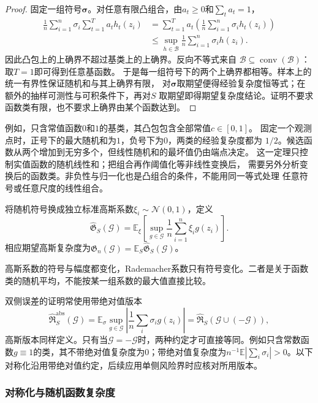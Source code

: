 \begin{proof}
固定一组符号$\bm\sigma$。对任意有限凸组合，由$a_t\geq0$和$\sum_ta_t=1$，
\[
 \begin{aligned}
 \frac1n\sum_{i=1}^n\sigma_i\sum_{t=1}^T a_t h_t(z_i)
 &=\sum_{t=1}^T a_t
    \left(\frac1n\sum_{i=1}^n\sigma_i h_t(z_i)\right)\\
 &\leq\sup_{h\in\mathcal B}\frac1n\sum_{i=1}^n\sigma_i h(z_i).
 \end{aligned}
\]
因此凸包上的上确界不超过基类上的上确界。反向不等式来自
$\mathcal B\subseteq\operatorname{conv}(\mathcal B)$：取$T=1$即可得到任意基函数。
于是每一组符号下的两个上确界都相等。样本上的统一有界性保证随机和与其上确界有限，
对$\bm\sigma$取期望便得经验复杂度恒等式；在额外的抽样可测性与可积条件下，再对$S$
取期望即得期望复杂度结论。证明不要求函数类有限，也不要求上确界由某个函数达到。
\end{proof}

例如，只含常值函数$0$和$1$的基类，其凸包包含全部常值$c\in[0,1]$。
固定一个观测点时，正号下的最大随机和为$1$，负号下为$0$，两类的经验复杂度都为
$1/2$。候选函数从两个增加到无穷多个，但线性随机和的最坏值仍由端点决定。
这一定理只控制实值函数的随机线性和；把组合再作阈值化等非线性变换后，
需要另外分析变换后的函数类。非负性与归一化也是凸组合的条件，不能用同一等式处理
任意符号或任意尺度的线性组合。

\begin{definition}[经验高斯复杂度]
  \label{def:gaussian-complexity}
  将随机符号换成独立标准高斯系数\(\xi_i\sim\mathcal N(0,1)\)，定义
  \[
    \widehat{\mathfrak G}_S(\mathcal G)
    =\mathbb E_\xi\left[\sup_{g\in\mathcal G}\frac1n\sum_{i=1}^n\xi_i g(z_i)\right].
  \]
  相应期望高斯复杂度为\(\mathfrak G_n(\mathcal G)=\mathbb E_S\widehat{\mathfrak G}_S(\mathcal G)\)。
\end{definition}
高斯系数的符号与幅度都变化，Rademacher系数只有符号变化。二者是关于函数类的随机平均，不能按某一组系数的最大值直接比较。

双侧误差的证明常使用带绝对值版本
\[
  \widehat{\mathfrak R}^{\mathrm{abs}}_S(\mathcal G)
  =\mathbb E_\sigma\sup_{g\in\mathcal G}\left|\frac1n\sum_i\sigma_i g(z_i)\right|
  =\widehat{\mathfrak R}_S(\mathcal G\cup(-\mathcal G)),
\]
高斯版本同样定义。只有当\(\mathcal G=-\mathcal G\)时，两种约定才可直接等同。例如只含常数函数\(g\equiv1\)的类，其不带绝对值复杂度为\(0\)；带绝对值复杂度为\(n^{-1}\mathbb E|\sum_i\sigma_i|>0\)。以下对称化沿用带绝对值约定，后续应用单侧风险界时应核对所用版本。

\subsubsection{对称化与随机函数复杂度}

